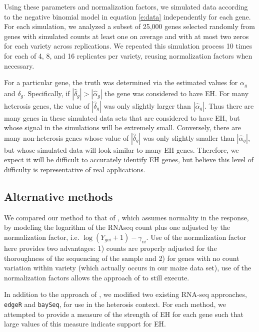 \documentclass[useAMS,usenatbib,referee]{biom}
\newcommand{\edgeR}{{\tt edgeR}}
\newcommand{\baySeq}{{\tt baySeq}}
\newcommand{\RNAseq}{RNA-seq}
\begin{document}
Using these parameters and normalization factors, we simulated data according to the negative binomial model in equation \eqref{e:data} independently for each gene. For each simulation, we analyzed a subset of 25,000 genes selected randomly from genes with simulated counts at least one on average and with at most two zeros for each variety across replications.  We repeated this simulation process 10 times for each of 4, 8, and 16 replicates per variety, reusing normalization factors when necessary.  

For a particular gene, the truth was determined via the estimated values for $\alpha_g$ and $\delta_g$. Specifically, if $|\hat{\delta}_g| >|\hat{\alpha}_g|$ the gene was considered to have EH. For many heterosis genes, the value of $|\hat{\delta}_g|$ was only slightly larger than $|\hat{\alpha}_g|$. Thus there are many genes in these simulated data sets that are considered to have EH, but whose signal in the simulations will be extremely small. Conversely, there are many non-heterosis genes whose value of $|\hat{\delta}_g|$ was only slightly smaller than $|\hat{\alpha}_g|$, but whose simulated data will look similar to many EH genes. Therefore, we expect it will be difficult to accurately identify EH genes, but believe this level of difficulty is representative of real applications.

\subsection{Alternative methods}
\label{s:alternative}

We compared our method to that of \cite{ji2014estimation}, which assumes normality in the response, by modeling the logarithm of the RNAseq count plus one adjusted by the normalization factor, i.e. $\log(Y_{gvi}+1)-\gamma_{vi}$. Use of the normalization factor here provides two advantages: 1) counts are properly adjusted for the thoroughness of the sequencing of the sample and 2) for genes with no count variation within variety (which actually occurs in our maize data set), use of the normalization factors allows the approach of \citeauthor{ji2014estimation} to still execute. 

In addition to the approach of \citeauthor{ji2014estimation}, we modified two existing \RNAseq{} approaches, \edgeR{} and \baySeq{}, for use in the heterosis context. For each method, we attempted to provide a measure of the strength of EH for each gene such that large values of this measure indicate support for EH. 
\end{document}
